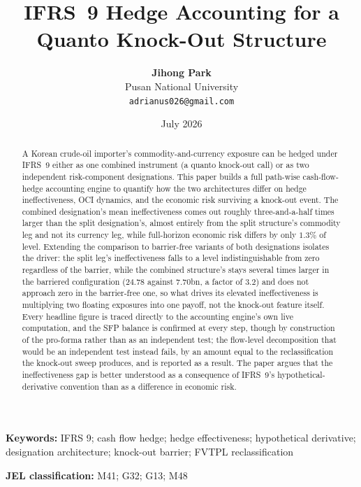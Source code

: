 \documentclass[11pt,a4paper]{article}
\title{\textbf{IFRS~9 Hedge Accounting for a Quanto Knock-Out Structure}}
\author{\textbf{Jihong Park} \\ Pusan National University \\ \texttt{adrianus026@gmail.com}}
\date{July 2026}
\begin{document}
\maketitle

\begin{abstract}
A Korean crude-oil importer's commodity-and-currency exposure can be hedged under IFRS~9 either as one combined instrument (a quanto knock-out call) or as two independent risk-component designations. This paper builds a full path-wise cash-flow-hedge accounting engine to quantify how the two architectures differ on hedge ineffectiveness, OCI dynamics, and the economic risk surviving a knock-out event. The combined designation's mean ineffectiveness comes out roughly three-and-a-half times larger than the split designation's, almost entirely from the split structure's commodity leg and not its currency leg, while full-horizon economic risk differs by only $1.3\%$ of level. Extending the comparison to barrier-free variants of both designations isolates the driver: the split leg's ineffectiveness falls to a level indistinguishable from zero regardless of the barrier, while the combined structure's stays several times larger in the barriered configuration ($24.78$ against $7.70$bn, a factor of $3.2$) and does not approach zero in the barrier-free one, so what drives its elevated ineffectiveness is multiplying two floating exposures into one payoff, not the knock-out feature itself. Every headline figure is traced directly to the accounting engine's own live computation, and the SFP balance is confirmed at every step, though by construction of the pro-forma rather than as an independent test; the flow-level decomposition that would be an independent test instead fails, by an amount equal to the reclassification the knock-out sweep produces, and is reported as a result. The paper argues that the ineffectiveness gap is better understood as a consequence of IFRS~9's hypothetical-derivative convention than as a difference in economic risk.
\end{abstract}

\vspace{0.5em}
\noindent\textbf{Keywords:} IFRS 9; cash flow hedge; hedge effectiveness; hypothetical derivative; designation architecture; knock-out barrier; FVTPL reclassification

\vspace{0.3em}
\noindent\textbf{JEL classification:} M41; G32; G13; M48

\tableofcontents
\newpage
\end{document}
